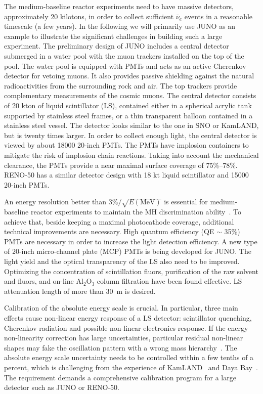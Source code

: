\documentclass[aps,twocolumn,preprintnumbers,amsmath,superscriptaddress,amssymb,floats,nofootinbib]{revtex4-1}
\begin{document}
The medium-baseline reactor experiments need to have massive detectors, approximately 20 kilotons, in order to collect sufficient $\bar\nu_e$ events in a reasonable timescale (a few years).
In the following we will primarily use JUNO as an example to illustrate the significant challenges in building such a large experiment.
The preliminary design of JUNO includes a central detector submerged in a water pool with the muon trackers installed on the top of the pool.
The water pool is equipped with PMTs and acts as an active Cherenkov detector for vetoing muons.
It also provides passive shielding against the natural radioactivities from the surrounding rock and air.
The top trackers provide complementary measurements of the cosmic muons.
The central detector consists of 20 kton of liquid scintillator (LS), contained either in a spherical acrylic tank supported by stainless steel frames, or a thin transparent balloon contained in a stainless steel vessel.
The detector looks similar to the one in SNO or KamLAND, but is twenty times larger.
In order to collect enough light, the central detector is viewed by about 18000 20-inch PMTs.
The PMTs have implosion containers to mitigate the risk of implosion chain reactions. Taking into account the mechanical clearance, the PMTs provide a near maximal surface coverage of 75\%--78\%. RENO-50 has a similar detector design with 18 kt liquid scintillator and 15000 20-inch PMTs.

An energy resolution better than $3\%/\sqrt{E(\textrm{MeV})}$ is essential for medium-baseline reactor experiments to maintain the MH discrimination ability~\cite{Li-PRD13}.
To achieve that, beside keeping a maximal photocathode coverage, additional technical improvements are necessary.
High quantum efficiency (QE $\sim$ 35\%) PMTs are necessary in order to increase the light detection efficiency. A new type of 20-inch micro-channel plate (MCP) PMTs is being developed for JUNO. The light yield and the optical transparency of the LS also need to be improved. Optimizing the concentration of scintillation fluors, purification of the raw solvent and fluors, and on-line Al$_2$O$_3$ column filtration have been found effective. LS attenuation length of more than 30~m is desired.

Calibration of the absolute energy scale is crucial.
In particular, three main effects cause non-linear energy response of a LS detector: scintillator quenching, Cherenkov radiation and possible non-linear electronics response.
If the energy non-linearity correction has large uncertainties, particular residual non-linear shapes may fake the oscillation pattern with a wrong mass hierarchy~\cite{Qian-PRD13}.
The absolute energy scale uncertainty needs to be controlled within a few tenths of a percent, which is challenging from the experience of KamLAND~\cite{KamLAND-4pi} and Daya Bay~\cite{Zhang-Neutrino14}. The requirement demands a comprehensive calibration program for a large detector such as JUNO or RENO-50.
\end{document}
